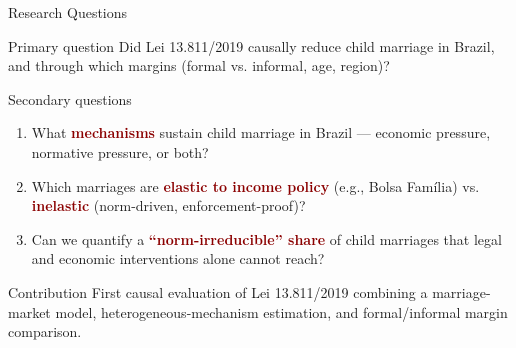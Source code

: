 \documentclass[aspectratio=169,10pt]{beamer}
\newcommand{\hl}[1]{\textcolor{darkred}{\textbf{#1}}}
\begin{document}
\begin{frame}{Research Questions}
    \begin{block}{Primary question}
        Did Lei 13.811/2019 causally reduce child marriage in Brazil, and through which margins (formal vs. informal, age, region)?
    \end{block}

    \begin{block}{Secondary questions}
        \begin{enumerate}
            \item What \hl{mechanisms} sustain child marriage in Brazil --- economic pressure, normative pressure, or both?
            \item Which marriages are \hl{elastic to income policy} (e.g., Bolsa Fam\'ilia) vs. \hl{inelastic} (norm-driven, enforcement-proof)?
            \item Can we quantify a \hl{``norm-irreducible'' share} of child marriages that legal and economic interventions alone cannot reach?
        \end{enumerate}
    \end{block}

    \begin{block}{Contribution}
        First causal evaluation of Lei 13.811/2019 combining a marriage-market model, heterogeneous-mechanism estimation, and formal/informal margin comparison.
    \end{block}
\end{frame}
\end{document}
